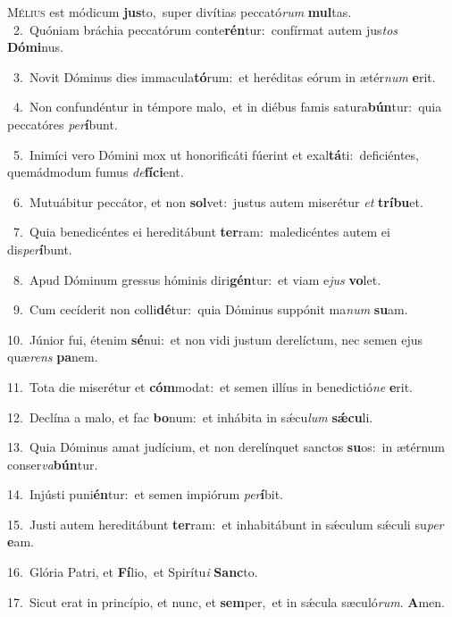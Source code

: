 \lettrine{\initial\textcolor{\initialcolor}{M}}{élius} est módicum \textbf{jus}\-to,~\star super divítias peccató\textit{rum} \textbf{mul}\-tas.\\
{\numbfont\textcolor{\numbcolor}{~2.}}~Quóniam bráchia peccatórum conte\-\textbf{rén}\-tur:~\star confírmat autem jus\textit{tos} \textbf{Dó}\-\textbf{mi}nus.\par
{\numbfont\textcolor{\numbcolor}{~3.}}~Novit Dóminus dies immacula\-\textbf{tó}\-rum:~\star et heréditas eórum in ætér\textit{num} \textbf{e}\-rit.\par
{\numbfont\textcolor{\numbcolor}{~4.}}~Non confundéntur in témpore malo,~\dagger et in diébus famis satura\-\textbf{bún}\-tur:~\star quia peccatóres \textit{per}\-\textbf{í}bunt.\par
{\numbfont\textcolor{\numbcolor}{~5.}}~Inimíci vero Dómini mox ut honorificáti fúerint et exal\-\textbf{tá}\-ti:~\star deficiéntes, quemádmodum fumus \textit{de}\-\textbf{fí}\textbf{ci}ent.\par
{\numbfont\textcolor{\numbcolor}{~6.}}~Mutuábitur peccátor, et non \textbf{sol}\-vet:~\star justus autem miserétur \textit{et} \textbf{trí}\-\textbf{bu}et.\par
{\numbfont\textcolor{\numbcolor}{~7.}}~Quia benedicéntes ei hereditábunt \textbf{ter}\-ram:~\star maledicéntes autem ei dis\-\textit{per}\-\textbf{í}bunt.\par
{\numbfont\textcolor{\numbcolor}{~8.}}~Apud Dóminum gressus hóminis diri\-\textbf{gén}\-tur:~\star et viam e\textit{jus} \textbf{vo}\-let.\par
{\numbfont\textcolor{\numbcolor}{~9.}}~Cum cecíderit non colli\-\textbf{dé}\-tur:~\star quia Dóminus suppónit ma\textit{num} \textbf{su}\-am.\par
{\numbfont\textcolor{\numbcolor}{10.}}~Júnior fui, étenim \textbf{sé}\-nui:~\star et non vidi justum derelíctum, nec semen ejus quæ\textit{rens} \textbf{pa}\-nem.\par
{\numbfont\textcolor{\numbcolor}{11.}}~Tota die miserétur et \textbf{cóm}\-modat:~\star et semen illíus in benedictió\textit{ne} \textbf{e}\-rit.\par
{\numbfont\textcolor{\numbcolor}{12.}}~Declína a malo, et fac \textbf{bo}\-num:~\star et inhábita in sǽcu\textit{lum} \textbf{sǽ}\-\textbf{cu}li.\par
{\numbfont\textcolor{\numbcolor}{13.}}~Quia Dóminus amat judícium, et non derelínquet sanctos \textbf{su}\-os:~\star in ætérnum conser\-\textit{va}\-\textbf{bún}tur.\par
{\numbfont\textcolor{\numbcolor}{14.}}~Injústi puni\-\textbf{én}\-tur:~\star et semen impiórum \textit{per}\-\textbf{í}bit.\par
{\numbfont\textcolor{\numbcolor}{15.}}~Justi autem hereditábunt \textbf{ter}\-ram:~\star et inhabitábunt in sǽculum sǽculi su\textit{per} \textbf{e}\-am.\par
{\numbfont\textcolor{\numbcolor}{16.}}~Glória Patri, et \textbf{Fí}\-lio,~\star et Spirítu\textit{i} \textbf{Sanc}\-to.\par
{\numbfont\textcolor{\numbcolor}{17.}}~Sicut erat in princípio, et nunc, et \textbf{sem}\-per,~\star et in sǽcula sæculó\-\textit{rum}\-. \textbf{A}\-men.\par

